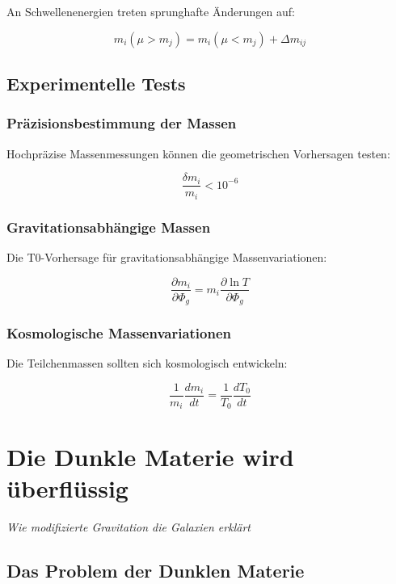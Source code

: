 \documentclass[12pt,a4paper]{report}
\begin{document}
	An Schwellenenergien treten sprunghafte Änderungen auf:
	
	\begin{equation}
		m_i(\mu > m_j) = m_i(\mu < m_j) + \Delta m_{ij}
	\end{equation}
	
	\section{Experimentelle Tests}
	
	\subsection{Präzisionsbestimmung der Massen}
	
	Hochpräzise Massenmessungen können die geometrischen Vorhersagen testen:
	
	\begin{equation}
		\frac{\delta m_i}{m_i} < 10^{-6}
	\end{equation}
	
	\subsection{Gravitationsabhängige Massen}
	
	Die T0-Vorhersage für gravitationsabhängige Massenvariationen:
	
	\begin{equation}
		\frac{\partial m_i}{\partial \Phi_g} = m_i \frac{\partial \ln T}{\partial \Phi_g}
	\end{equation}
	
	\subsection{Kosmologische Massenvariationen}
	
	Die Teilchenmassen sollten sich kosmologisch entwickeln:
	
	\begin{equation}
		\frac{1}{m_i}\frac{dm_i}{dt} = \frac{1}{T_0}\frac{dT_0}{dt}
	\end{equation}
	
	\chapter{Die Dunkle Materie wird überflüssig}
	\textit{Wie modifizierte Gravitation die Galaxien erklärt}
	
	\section{Das Problem der Dunklen Materie}
	
\end{document}

